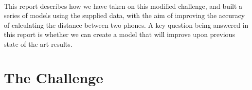 \documentclass[conference]{IEEEtran}
\begin{document}
\begin{table} [!h]
\centering
{}
    \caption{Previous state of the art results}
\label{table:summary}
\end{table}\\
This report describes how we have taken on this modified challenge, and built a series of models using the supplied data, with the aim of improving the accuracy of calculating the distance between two phones. A key question being answered in this report is whether we can create a model that will improve upon previous state of the art results.
\section{The Challenge}
\end{document}
